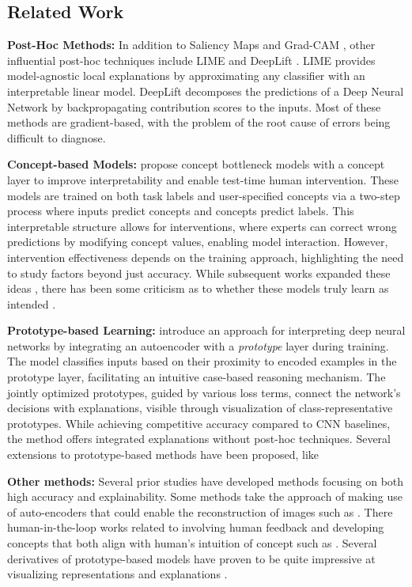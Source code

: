 \documentclass[letterpaper]{article}
\begin{document}
\subsection{Related Work}\label{sec:rel_work}

\textbf{Post-Hoc Methods:} In addition to Saliency Maps \cite{saliency_maps} and Grad-CAM \cite{GradCAM}, other influential post-hoc techniques include LIME \cite{guestrin} and DeepLift \cite{deeplift}. LIME provides model-agnostic local explanations by approximating any classifier with an interpretable linear model. DeepLift decomposes the predictions of a Deep Neural Network by backpropagating contribution scores to the inputs. Most of these methods are gradient-based, with the problem of the root cause  of errors being difficult to diagnose.


\textbf{Concept-based Models: }\cite{CBM} propose concept bottleneck models with a concept layer to improve interpretability and enable test-time human intervention. These models are trained on both task labels and user-specified concepts via a two-step process where inputs predict concepts and concepts predict labels. This interpretable structure allows for interventions, where experts can correct wrong predictions by modifying concept values, enabling model interaction. However, intervention effectiveness depends on the training approach, highlighting the need to study factors beyond just accuracy. While subsequent works expanded these ideas \cite{interactive, zarlenga2022concept, yuksekgonul2022posthoc}, there has been some criticism as to whether these models truly learn as intended \cite{margeloiu2021concept}.

\textbf{Prototype-based Learning: }\cite{prototype_paper} introduce an approach for interpreting deep neural networks by integrating an autoencoder with a \textit{prototype} layer during training. The model classifies inputs based on their proximity to encoded examples in the prototype layer, facilitating an intuitive case-based reasoning mechanism. The jointly optimized prototypes, guided by various loss terms, connect the network's decisions with explanations, visible through visualization of class-representative prototypes. While achieving competitive accuracy compared to CNN baselines, the method offers integrated explanations without post-hoc techniques.
Several extensions to prototype-based methods have been proposed, like \cite{prototype_1, Donnelly_2022_CVPR}

\textbf{Other methods: } Several prior studies have developed methods focusing on both high accuracy and explainability. Some methods take the approach of making use of auto-encoders that could enable the reconstruction of images such as \cite{efros2}. There human-in-the-loop works related to involving human feedback and developing concepts that both align with human's intuition of concept such as \cite{concept_human}. Several derivatives of prototype-based models have proven to be quite impressive at visualizing representations and explanations \cite{prototype}.
\end{document}
